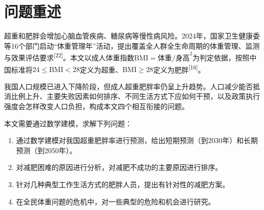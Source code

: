 \section{问题重述}

超重和肥胖会增加心脑血管疾病、糖尿病等慢性病风险。2024年，国家卫生健康委等16个部门启动“体重管理年”活动，提出覆盖全人群全生命周期的体重管理、监测与效果评估要求\textsuperscript{[22]}。本文以成人体重指数$\mathrm{BMI}=\text{体重}/\text{身高}^2$为判定依据，按照中国标准将$24\leq\mathrm{BMI}<28$定义为超重、$\mathrm{BMI}\geq28$定义为肥胖\textsuperscript{[16]}。

我国人口规模已进入下降阶段，但成人超重肥胖率仍呈上升趋势。人口减少能否抵消比例上升、主要失败因素如何排序、不同生活方式下应如何干预，以及政策执行强度会怎样改变人口负担，构成本文四个相互衔接的问题。

本文需要通过数学建模，求解下列问题：
\begin{enumerate}[label=(\arabic*),leftmargin=2em]
  \item 通过数学建模对我国超重肥胖率进行预测，给出短期预测（到2030年）和长期预测（到2050年）。
  \item 对减肥困难的原因进行分析，对减肥不成功的主要原因进行排序。
  \item 针对几种典型工作生活方式的肥胖人员，提出有针对性的减肥方案。
  \item 在全民体重问题的危机中，对一些典型的危险和机会进行研究。
\end{enumerate}

